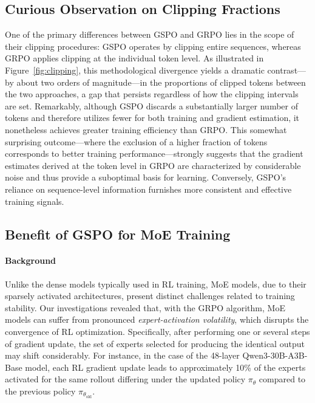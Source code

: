 \subsection{Curious Observation on Clipping Fractions}

One of the primary differences between GSPO and GRPO lies in the scope of their clipping procedures: GSPO operates by clipping entire sequences, whereas GRPO applies clipping at the individual token level. As illustrated in Figure~\ref{fig:clipping}, this methodological divergence yields a dramatic contrast—by about two orders of magnitude—in the proportions of clipped tokens between the two approaches, a gap that persists regardless of how the clipping intervals are set. Remarkably, although GSPO discards a substantially larger number of tokens and therefore utilizes fewer for both training and gradient estimation, it nonetheless achieves greater training efficiency than GRPO. This somewhat surprising outcome—where the exclusion of a higher fraction of tokens corresponds to better training performance—strongly suggests that the gradient estimates derived at the token level in GRPO are characterized by considerable noise and thus provide a suboptimal basis for learning. Conversely, GSPO’s reliance on sequence-level information furnishes more consistent and effective training signals.

\subsection{Benefit of GSPO for MoE Training}
\label{subsec:routing_replay}

\paragraph{Background}
Unlike the dense models typically used in RL training, MoE models, due to their sparsely activated architectures, present distinct challenges related to training stability. Our investigations revealed that, with the GRPO algorithm, MoE models can suffer from pronounced \textit{expert-activation volatility}, which disrupts the convergence of RL optimization. Specifically, after performing one or several steps of gradient update, the set of experts selected for producing the identical output may shift considerably. For instance, in the case of the 48-layer Qwen3-30B-A3B-Base model, each RL gradient update leads to approximately 10\% of the experts activated for the same rollout differing under the updated policy $\pi_{\theta}$ compared to the previous policy $\pi_{\theta_\text{old}}$.

